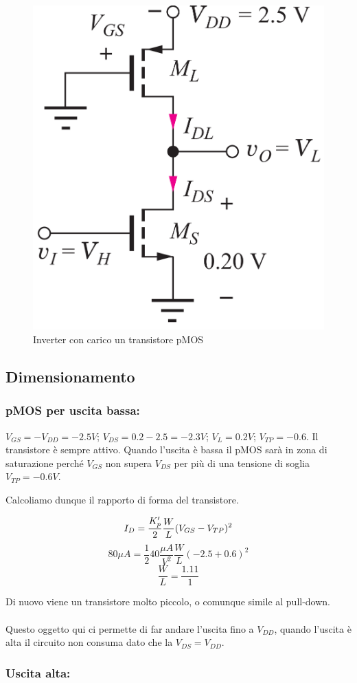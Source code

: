 \begin{figure}[htbp]
    \centering
    \includegraphics[width=0.27\linewidth]{img/inverter_pmos_pseudo.png}
    \caption{Inverter con carico un transistore pMOS}    
\end{figure}

\subsection{Dimensionamento}
\subsubsection{pMOS per uscita bassa:} $V_{GS} = -V_{DD} = -2.5V $; $V_{DS} = 0.2 - 2.5 = -2.3 V$; $ V_L = 0.2 V$; $V_{TP} = -0.6$. Il transistore è sempre attivo. Quando l'uscita è bassa il pMOS sarà in zona di saturazione perché $V_{GS}$ non supera $V_{DS}$ per più di una tensione di soglia $V_{TP} = -0.6 V$.

Calcoliamo dunque il rapporto di forma del transistore.

\begin{equation*}
    I_D = \frac{K_p'}{2}\frac{W}{L}(V_{GS} - V_{TP})^2
\end{equation*}
\begin{equation*}
    80 \mu A = \frac{1}{2}40 \frac{\mu A}{V^2}\frac{W}{L}(-2.5 + 0.6)^2
\end{equation*}
\begin{equation*}
    \frac{W}{L} = \frac{1.11}{1}
\end{equation*}

Di nuovo viene un transistore molto piccolo, o comunque simile al pull-down. 

\paragraph{}
Questo oggetto qui ci permette di far andare l'uscita fino a $V_{DD}$, quando l'uscita è alta il circuito non consuma dato che la $V_{DS} = V_{DD}$. 


\subsubsection{Uscita alta:}

